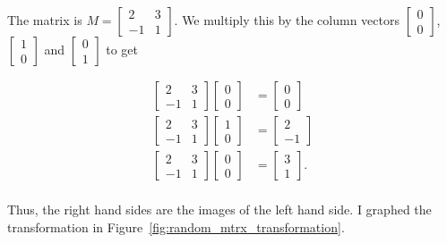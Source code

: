 \documentclass[../key.tex]{subfiles}
\begin{document}
The matrix is $M=\begin{bmatrix} 2 & 3 \\ -1 & 1 \end{bmatrix}$. We multiply this by the column vectors $\begin{bmatrix} 0 \\ 0 \end{bmatrix}$, $\begin{bmatrix} 1 \\ 0 \end{bmatrix}$ and $\begin{bmatrix} 0 \\ 1 \end{bmatrix}$ to get

\begin{align*}
\begin{bmatrix} 2 & 3 \\ -1 & 1 \end{bmatrix}\begin{bmatrix} 0 \\ 0 \end{bmatrix} &= \begin{bmatrix} 0 \\ 0 \end{bmatrix} \\
\begin{bmatrix} 2 & 3 \\ -1 & 1 \end{bmatrix}\begin{bmatrix} 1 \\ 0 \end{bmatrix} &= \begin{bmatrix} 2 \\ -1 \end{bmatrix} \\
\begin{bmatrix} 2 & 3 \\ -1 & 1 \end{bmatrix}\begin{bmatrix} 0 \\ 0 \end{bmatrix} &= \begin{bmatrix} 3 \\ 1 \end{bmatrix}. \\
\end{align*}

Thus, the right hand sides are the images of the left hand side. I graphed the transformation in Figure~\ref{fig:random_mtrx_transformation}.
\end{document}
